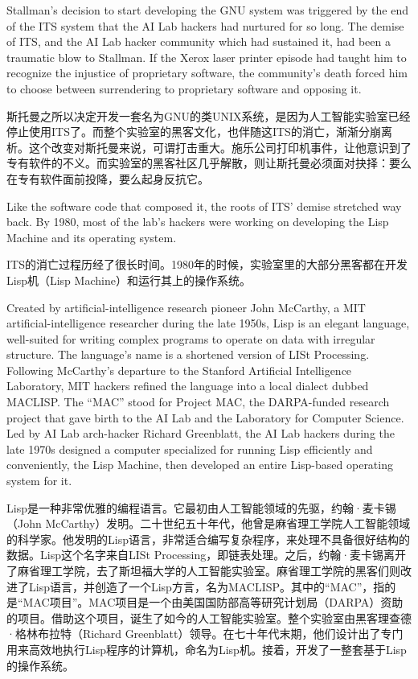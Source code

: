 \ifdefined\eng
Stallman's decision to start developing the GNU system was triggered by the end of the ITS system that the AI Lab hackers had nurtured for so long. The demise of ITS, and the AI Lab hacker community which had sustained it, had been a traumatic blow to Stallman. If the Xerox laser printer episode had taught him to recognize the injustice of proprietary software, the community's death forced him to choose between surrendering to proprietary software and opposing it.
\fi

\ifdefined\chs
斯托曼之所以决定开发一套名为GNU的类UNIX系统，是因为人工智能实验室已经停止使用ITS了。而整个实验室的黑客文化，也伴随这ITS的消亡，渐渐分崩离析。这个改变对斯托曼来说，可谓打击重大。施乐公司打印机事件，让他意识到了专有软件的不义。而实验室的黑客社区几乎解散，则让斯托曼必须面对抉择：要么在专有软件面前投降，要么起身反抗它。
\fi

\ifdefined\eng
Like the software code that composed it, the roots of ITS' demise stretched way back.  By 1980, most of the lab's hackers were working on developing the Lisp Machine and its operating system.
\fi

\ifdefined\chs
ITS的消亡过程历经了很长时间。1980年的时候，实验室里的大部分黑客都在开发Lisp机（Lisp Machine）和运行其上的操作系统。
\fi

\ifdefined\eng
Created by artificial-intelligence research pioneer John McCarthy, a MIT artificial-intelligence researcher during the late 1950s, Lisp is an elegant language, well-suited for writing complex programs to operate on data with irregular structure. The language's name is a shortened version of LISt Processing. Following McCarthy's departure to the Stanford Artificial Intelligence Laboratory, MIT hackers refined the language into a local dialect dubbed MACLISP. The ``MAC'' stood for Project MAC, the DARPA-funded research project that gave birth to the AI Lab and the Laboratory for Computer Science. Led by AI Lab arch-hacker Richard Greenblatt, the AI Lab hackers during the late 1970s designed a computer specialized for running Lisp efficiently and conveniently, the Lisp Machine, then developed an entire Lisp-based operating system for it.
\fi

\ifdefined\chs
Lisp是一种非常优雅的编程语言。它最初由人工智能领域的先驱，约翰·麦卡锡（John McCarthy）发明。二十世纪五十年代，他曾是麻省理工学院人工智能领域的科学家。他发明的Lisp语言，非常适合编写复杂程序，来处理不具备很好结构的数据。Lisp这个名字来自LISt Processing，即链表处理。之后，约翰·麦卡锡离开了麻省理工学院，去了斯坦福大学的人工智能实验室。麻省理工学院的黑客们则改进了Lisp语言，并创造了一个Lisp方言，名为MACLISP。其中的``MAC''，指的是``MAC项目''。MAC项目是一个由美国国防部高等研究计划局（DARPA）资助的项目。借助这个项目，诞生了如今的人工智能实验室。整个实验室由黑客理查德·格林布拉特（Richard Greenblatt）领导。在七十年代末期，他们设计出了专门用来高效地执行Lisp程序的计算机，命名为Lisp机。接着，开发了一整套基于Lisp的操作系统。
\fi

